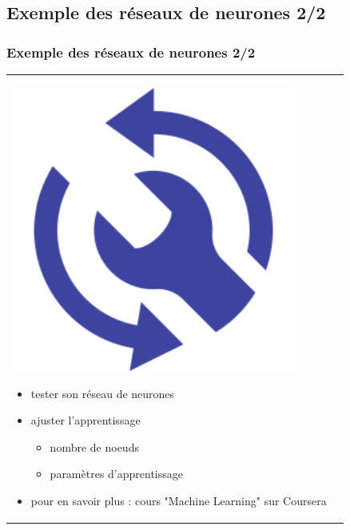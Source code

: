 \documentclass[handout]{beamer}
\begin{document}
	\subsection{Exemple des réseaux de neurones 2/2}
		\begin{frame}
		\frametitle{Exemple des réseaux de neurones 2/2}
		\begin{tabular}{l l}
			\begin{minipage}{0.2\textwidth}
				\begin{center}
					\includegraphics[width=0.9\textwidth]{images/ajust.png}
				\end{center}
			\end{minipage}

			\begin{minipage}{0.8\textwidth}
				\begin{itemize}
					\item tester son réseau de neurones
					\item ajuster l'apprentissage
					\begin{itemize}
						\item nombre de noeuds
						\item paramètres d'apprentissage
					\end{itemize}
					\item pour en savoir plus : cours "Machine Learning" sur Coursera
				\end{itemize}
			\end{minipage}
			
		\end{tabular}
		\end{frame}
\end{document}
